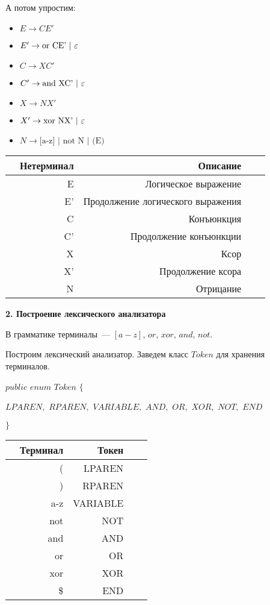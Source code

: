 \documentclass[11pt,a4paper,oneside]{article}
\begin{document}
А потом упростим:

\begin{itemize}
  \item $E \rightarrow CE'$
  \item $E' \rightarrow \mbox{or CE' | $\varepsilon$}$
  \item $C \rightarrow XC'$
  \item $C' \rightarrow \mbox{and XC' | $\varepsilon$}$
  \item $X \rightarrow NX'$
  \item $X' \rightarrow \mbox{xor NX' | $\varepsilon$}$
  \item $N \rightarrow \mbox{[a-z] | not N | (E)}$
\end{itemize}

\begin{tabular}{|c||r|rrr||}
\hline
 & Нетерминал & Описание \\
\hline
\hline
 & E  & Логическое выражение \\
 & E' & Продолжение логического выражения \\
 & C  & Конъюнкция \\
 & C' & Продолжение конъюнкции \\
 & X  & Ксор \\
 & X' & Продолжение ксора \\
 & N  & Отрицание \\
\hline
\end{tabular}
\newline

\textbf{2. Построение лексического анализатора}
\newline                    
\newline

В грамматике терминалы~--- $[a-z]$, $or$, $xor$, $and$, $not$.

Построим лексический анализатор. Заведем класс $Token$ для хранения терминалов.

$public$ $enum$ $Token$ $\{$

    $LPAREN,$ $RPAREN,$ $VARIABLE,$ $AND,$ $OR,$ $XOR,$ $NOT,$ $END$

$\}$

\begin{tabular}{|c||r|rrr|}
\hline
 & Терминал & Токен \\
\hline
\hline
 & ( & LPAREN  \\
 & ) & RPAREN \\
 & a-z & VARIABLE \\
 & not & NOT \\
 & and & AND \\
 & or & OR \\
 & xor & XOR \\
 & \$ & END \\
\hline
\end{tabular}
\newline
\end{document}
